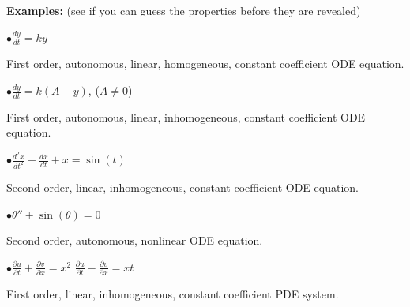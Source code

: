 \documentclass[10pt,aspectratio=169]{beamer}
\begin{document}
\begin{frame}
\textbf{Examples:} (see if you can guess the properties before they are
revealed)

\medskip
\pause

$\bullet$\quad$\displaystyle
\frac{d y}{dt} = ky$

\medskip
\pause

First order, autonomous, linear, homogeneous, constant coefficient ODE
equation.

\medskip
\pause

$\bullet$\quad$\displaystyle
\frac{d y}{dt} = k(A-y)$,
\qquad ($A \neq 0$)

\medskip
\pause

First order, autonomous, linear, inhomogeneous, constant coefficient ODE
equation.

\medskip
\pause

$\bullet$\quad$\displaystyle
\frac{d^2 x}{dt^2} + \frac{dx}{dt} + x = \sin(t)$

\medskip
\pause

Second order, linear, inhomogeneous, constant coefficient ODE equation.

\medskip
\pause

$\bullet$\quad$\displaystyle
\theta'' + \sin(\theta) = 0$

\medskip
\pause

Second order, autonomous, nonlinear ODE equation.

\medskip
\pause

$\bullet$\quad$\displaystyle
\frac{\partial u}{\partial t} + \frac{\partial v}{\partial x} = x^2$
\qquad
$\displaystyle
\frac{\partial u}{\partial t} - \frac{\partial v}{\partial x} = xt$

\medskip
\pause

First order, linear, inhomogeneous, constant coefficient PDE system.

\end{frame}
\end{document}

